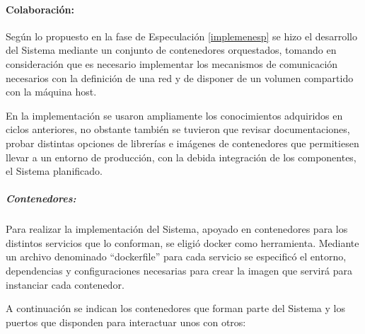 \documentclass[
  12pt,
  openany]{book}
\begin{document}
\hypertarget{implemencolab}{%
\paragraph{Colaboración:}\label{implemencolab}}

Según lo propuesto en la fase de Especulación \ref{implemenesp} se hizo el desarrollo del Sistema mediante un conjunto de contenedores orquestados, tomando en consideración que es necesario implementar los mecanismos de comunicación necesarios con la definición de una red y de disponer de un volumen compartido con la máquina host.

En la implementación se usaron ampliamente los conocimientos adquiridos en ciclos anteriores, no obstante también se tuvieron que revisar documentaciones, probar distintas opciones de librerías e imágenes de contenedores que permitiesen llevar a un entorno de producción, con la debida integración de los componentes, el Sistema planificado.

\hypertarget{contenedores-1}{%
\subparagraph{Contenedores:}\label{contenedores-1}}

Para realizar la implementación del Sistema, apoyado en contenedores para los distintos servicios que lo conforman, se eligió docker como herramienta. Mediante un archivo denominado ``dockerfile'' para cada servicio se especificó el entorno, dependencias y configuraciones necesarias para crear la imagen que servirá para instanciar cada contenedor.

A continuación se indican los contenedores que forman parte del Sistema y los puertos que disponden para interactuar unos con otros:
\end{document}
